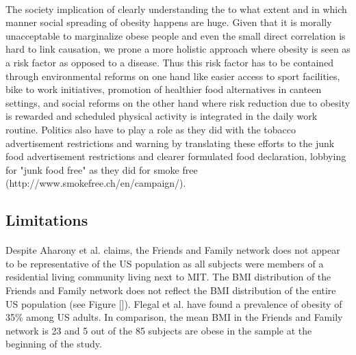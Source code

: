 \documentclass[11pt]{article}
\begin{document}
\paragraph{}
The society implication of clearly understanding the to what extent and in which manner social spreading of obesity happens are huge. Given that it is morally unacceptable to marginalize obese people and even the small direct correlation is hard to link causation, we prone a more holistic approach where obesity is seen as a risk factor as opposed to a disease. Thus this risk factor has to be contained through environmental reforms on one hand like easier access to sport facilities, bike to work initiatives, promotion of healthier food alternatives in canteen settings, and social reforms on the other hand where risk reduction due to obesity is rewarded and scheduled physical activity is integrated in the daily work routine. Politics also have to play a role as they did with the tobacco advertisement restrictions and warning by translating these efforts to the junk food advertisement restrictions and clearer formulated food declaration, lobbying for "junk food free" as they did for smoke free (http://www.smokefree.ch/en/campaign/).

\subsection{Limitations}
\paragraph{}
Despite Aharony et al. claims, the Friends and Family network does not appear to be representative of the US population as all subjects were members of a residential living community living next to MIT. The BMI distribution of the Friends and Family network does not reflect the BMI distribution of the entire US population (see Figure []). Flegal et al. have found a prevalence of obesity of 35\% among US adults. In comparison, the mean BMI in the Friends and Family network is 23 and 5 out of the 85 subjects are obese in the sample at the beginning of the study.
\end{document}
